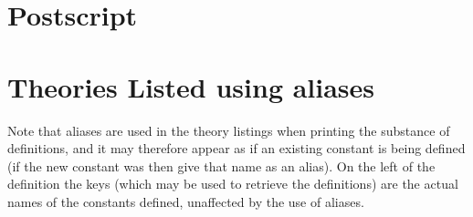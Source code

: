 
\section{Postscript}\label{POSTSCRIPT}

\appendix

\vfill

\section{Theories Listed using aliases}\label{TheoryListings}

Note that aliases are used in the theory listings when printing the substance of definitions, and it may therefore appear as if an existing constant is being defined (if the new constant was then give that name as an alias).
On the left of the definition the keys (which may be used to retrieve the definitions) are the actual names of the constants defined, unaffected by the use of aliases.

{
\let\Section\subsection
\let\Subsection\subsubsection
\def\subsection#1{\Subsection*{#1}}

\def\section#1{\Section{#1}\label{t045}}

\def\section#1{\Section{#1}\label{t045q}}

\def\section#1{\Section{#1}\label{t045k}}

\def\section#1{\Section{#1}\label{t045w}}

}  %


